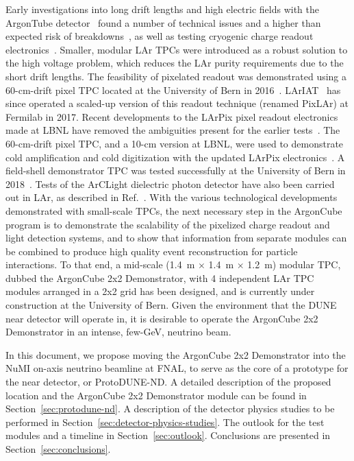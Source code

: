 Early investigations into long drift lengths and high electric fields with the ArgonTube detector~\cite{argontube_design} found a number of technical issues and a higher than expected risk of breakdowns~\cite{argontube}, as well as testing cryogenic charge readout electronics~\cite{art_cold_ero}. Smaller, modular LAr TPCs were introduced as a robust solution to the high voltage problem, which reduces the LAr purity requirements due to the short drift lengths. The feasibility of pixelated readout was demonstrated using a 60-cm-drift pixel TPC located at the University of Bern in 2016~\cite{pixels}. LArIAT~\cite{lariat} has since operated a scaled-up version of this readout technique (renamed PixLAr) at Fermilab in 2017. Recent developments to the LArPix pixel readout electronics made at LBNL have removed the ambiguities present for the earlier tests~\cite{larpix}. The 60-cm-drift pixel TPC, and a 10-cm version at LBNL, were used to demonstrate cold amplification and cold digitization with the updated LArPix electronics~\cite{larpix}. A field-shell demonstrator TPC was tested successfully at the University of Bern in 2018~\cite{argoncube_fd}. Tests of the ArCLight dielectric photon detector have also been carried out in LAr, as described in Ref.~\cite{arclight}. With the various technological developments demonstrated with small-scale TPCs, the next necessary step in the ArgonCube program is to demonstrate the scalability of the pixelized charge readout and light detection systems, and to show that information from separate modules can be combined to produce high quality event reconstruction for particle interactions. To that end, a mid-scale (1.4~m $\times$ 1.4~m $\times$ 1.2~m) modular TPC, dubbed the ArgonCube 2x2 Demonstrator, with 4 independent LAr TPC modules arranged in a 2x2 grid has been designed, and is currently under construction at the University of Bern. Given the environment that the DUNE near detector will operate in, it is desirable to operate the ArgonCube 2x2 Demonstrator in an intense, few-GeV, neutrino beam.

In this document, we propose moving the ArgonCube 2x2 Demonstrator into the NuMI on-axis neutrino beamline at FNAL, to serve as the core of a prototype for the near detector, or ProtoDUNE-ND. A detailed description of the proposed location and the ArgonCube 2x2 Demonstrator module can be found in Section~\ref{sec:protodune-nd}. A description of the detector physics studies to be performed in Section~\ref{sec:detector-physics-studies}. The outlook for the test modules and a timeline in Section~\ref{sec:outlook}. Conclusions are presented in Section~\ref{sec:conclusions}.\\\\

